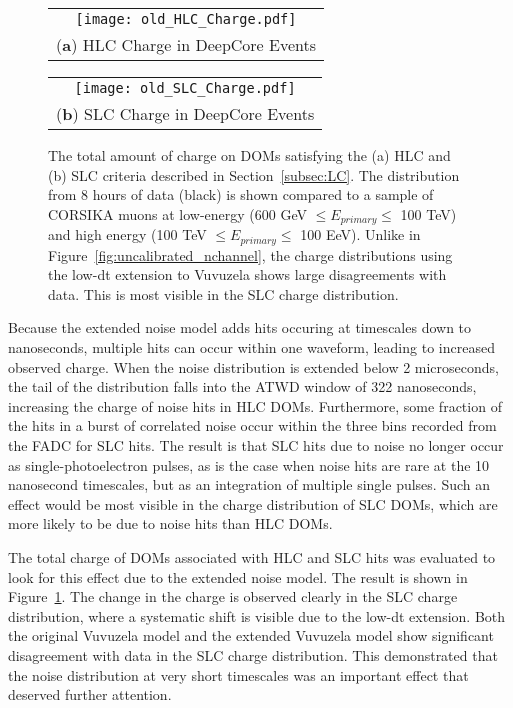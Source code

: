 \begin{figure}[h]
\centering
\begin{tabular}[b]{c}
  \texttt{[image: old\_HLC\_Charge.pdf]} \\
  \small (\textbf{\color{ctcolormain}a}) HLC Charge in DeepCore Events
\end{tabular} \hspace{2pt}
\begin{tabular}[b]{c}
  \texttt{[image: old\_SLC\_Charge.pdf]} \\
  \small (\textbf{\color{ctcolormain}b}) SLC Charge in DeepCore Events
\end{tabular}
\caption{The total amount of charge on DOMs satisfying the (a) HLC and (b) SLC criteria described in Section~\ref{subsec:LC}. The distribution from 8 hours of data (black) is shown compared to a sample of CORSIKA muons at low-energy (600 GeV $\leq E_{primary} \leq$ 100 TeV) and high energy (100 TeV $\leq E_{primary} \leq$ 100 EeV). Unlike in Figure~\ref{fig:uncalibrated_nchannel}, the charge distributions using the low-dt extension to Vuvuzela shows large disagreements with data. This is most visible in the SLC charge distribution.}
\label{fig:uncalibrated_charge}
\end{figure}

Because the extended noise model adds hits occuring at timescales down to nanoseconds, multiple hits can occur within one waveform, leading to increased observed charge.
When the noise distribution is extended below 2 microseconds, the tail of the distribution falls into the ATWD window of 322 nanoseconds, increasing the charge of noise hits in HLC DOMs.
Furthermore, some fraction of the hits in a burst of correlated noise occur within the three bins recorded from the FADC for SLC hits.
The result is that SLC hits due to noise no longer occur as single-photoelectron pulses, as is the case when noise hits are rare at the 10 nanosecond timescales, but as an integration of multiple single pulses.
Such an effect would be most visible in the charge distribution of SLC DOMs, which are more likely to be due to noise hits than HLC DOMs.

The total charge of DOMs associated with HLC and SLC hits was evaluated to look for this effect due to the extended noise model.
The result is shown in Figure~\ref{fig:uncalibrated_charge}.
The change in the charge is observed clearly in the SLC charge distribution, where a systematic shift is visible due to the low-dt extension.
Both the original Vuvuzela model and the extended Vuvuzela model show significant disagreement with data in the SLC charge distribution.
This demonstrated that the noise distribution at very short timescales was an important effect that deserved further attention.

